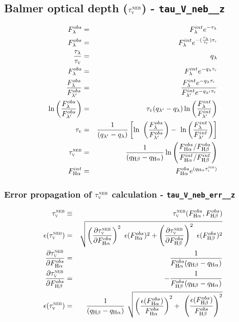 \documentclass[a4paper,11pt]{article}
\begin{document}
\subsection{Balmer optical depth ($\tau_{\mathrm{\textsc{v}}}^{\mathrm{\textsc{neb}}}$) - \texttt{tau\_V\_neb\_\_z}}

\begin{eqnarray}
	F_\lambda^{obs} &=& F_\lambda^{int} e^{-\tau_\lambda} \\
	F_\lambda^{obs} &=& F_\lambda^{int} e^{-(\frac{\tau_\lambda}{\tauV}) \tauV} \\
	\frac{\tau_\lambda}{\tauV} &=& q_\lambda \\
	F_\lambda^{obs} &=& F_\lambda^{int} e^{-q_\lambda \tauV} \\
	\frac{F_\lambda^{obs}}{F_{\lambda^\prime}^{obs}} &=& \
\frac{F_\lambda^{int} e^{-q_\lambda \tauV}}{F_{\lambda^\prime}^{int} e^{-q_{\lambda^\prime} \tauV}} \\
	\ln \left(\frac{F_\lambda^{obs}}{F_{\lambda^\prime}^{obs}}\right) &=& \
\tauV (q_{\lambda^\prime} - q_\lambda) \ln \left(\frac{F_\lambda^{int}}{F_{\lambda^\prime}^{int}}\right) \\
	\tauV &=& \frac{1}{(q_{\lambda^\prime} - q_\lambda)} \left[\ln \ 
\left(\frac{F_\lambda^{obs}}{F_{\lambda^\prime}^{obs}}\right) - \
\ln \left(\frac{F_\lambda^{int}}{F_{\lambda^\prime}^{int}}\right)\right] \\
	\tauVN &=& \frac{1}{(q_{\Hbeta} - q_{\Halpha})} \ln \left( \frac{ F_{\Halpha}^{obs} / F_{\Hbeta}^{obs}}{F_{\Halpha}^{int} / F_{\Hbeta}^{int}} \right) \\
	F_{\Halpha}^{int} &=& F_{\Halpha}^{obs} e^{(q_{\Halpha} \tauVN)}
\end{eqnarray}

\subsubsection{Error propagation of $\tau_{\mathrm{\textsc{v}}}^{\mathrm{\textsc{neb}}}$ calculation - \texttt{tau\_V\_neb\_err\_\_z}}
\begin{eqnarray}
	\tauVN &\equiv& \tauVN(F_{\Halpha}^{obs}, F_{\Hbeta}^{obs}) \\
	\epsilon (\tauVN) &=& \sqrt{\left(\del{\tauVN}{F_{\Halpha}^{obs}}\right)^2 \
\epsilon (F_{\Halpha}^{obs})^2 + \left(\del{\tauVN}{F_{\Hbeta}^{obs}}\right)^2 \
\epsilon (F_{\Hbeta}^{obs})^2 } \\
	\del{\tauVN}{F_{\Halpha}^{obs}} &=& \frac{1}{F_{\Halpha}^{obs} (q_{\Hbeta} - q_{\Halpha})} \\
	\del{\tauVN}{F_{\Hbeta}^{obs}} &=& - \frac{1}{F_{\Hbeta}^{obs} (q_{\Hbeta} - q_{\Halpha})} \\
	\epsilon (\tauVN) &=& \frac{1}{(q_{\Hbeta} - q_{\Halpha})} \
\sqrt{\left(\frac{\epsilon (F_{\Halpha}^{obs})}{F_{\Halpha}^{obs}}\right)^2 + \
\left(\frac{\epsilon (F_{\Hbeta}^{obs})}{F_{\Hbeta}^{obs}}\right)^2 }
\end{eqnarray}
\end{document}
